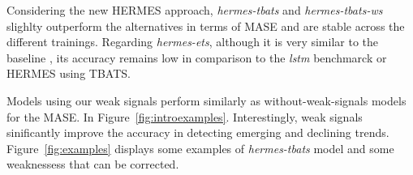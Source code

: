 \documentclass{article} %
\begin{document}
Considering the new HERMES approach, \textit{hermes-tbats} and \textit{hermes-tbats-ws} slighlty outperform the alternatives in terms of MASE and are stable across the different trainings. Regarding \textit{hermes-ets},   although it is very similar to the baseline \cite{smyl2020hybrid}, its accuracy remains low in comparison to the \textit{lstm} benchmarck or HERMES using TBATS. 

Models using our weak signals perform similarly as without-weak-signals models for the MASE. In Figure~\ref{fig:introexamples}. Interestingly, weak signals sinificantly improve the accuracy in detecting emerging and declining trends. Figure~\ref{fig:examples} displays some examples of \textit{hermes-tbats} model and some weaknessess that can be corrected.

\end{document}
